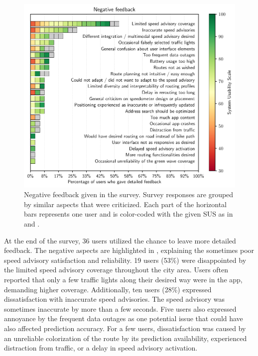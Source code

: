 \begin{figure}[t]
\caption{Negative feedback given in the survey. Survey responses are grouped by similar aspects that were criticized. Each part of the horizontal bars represents one user and is color-coded with the given SUS as in  and .}\label{fig:app-negative-feedback}
\includegraphics[width=\linewidth]{images/app-feedback-negative.pdf}
\end{figure}

At the end of the survey, 36 users utilized the chance to leave more detailed feedback. The negative aspects are highlighted in , explaining the sometimes poor speed advisory satisfaction and reliability. 19 users (53\%) were disappointed by the limited speed advisory coverage throughout the city area. Users often reported that only a few traffic lights along their desired way were in the app, demanding higher coverage. Additionally, ten users (28\%) expressed dissatisfaction with inaccurate speed advisories. The speed advisory was sometimes inaccurate by more than a few seconds. Five users also expressed annoyance by the frequent data outages as one potential issue that could have also affected prediction accuracy. For a few users, dissatisfaction was caused by an unreliable colorization of the route by its prediction availability, experienced distraction from traffic, or a delay in speed advisory activation.


